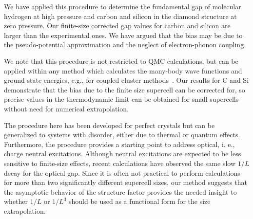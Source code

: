 We have applied this procedure to determine the fundamental gap of molecular hydrogen at high pressure
and carbon and silicon in the diamond structure at zero pressure. Our finite-size corrected gap values for carbon and silicon are larger than the experimental
ones. We have argued that the bias may be due to the pseudo-potential approximation and the neglect of electron-phonon coupling.

We note that this procedure is not restricted to QMC calculations, but can be applied
within any method which calculates the many-body wave functions and ground-state energies,
e.g., for coupled cluster methods~\cite{Gruber18}. Our results for C and Si demonstrate that
the bias due to the finite size supercell can be corrected for, so
precise values in the thermodynamic limit can be obtained for small supercells
without need for numerical extrapolation.

The procedure here has been developed for perfect crystals but can be generalized 
to systems with disorder, either due to thermal or quantum effects. Furthermore, the procedure provides a starting point 
to address optical, i. e.,  charge neutral excitations. Although neutral excitations are expected to be less sensitive to finite-size effects,
recent calculations \cite{Hunt,Frank19} have observed the same slow $1/L$ decay for the 
optical gap. Since it is often not practical to perform calculations for more than two significantly different supercell sizes, our method suggests that 
the asymptotic behavior of the structure factor provides
the needed insight to whether $1/L$ or $1/L^3$ should be used as a functional form for the
size extrapolation.